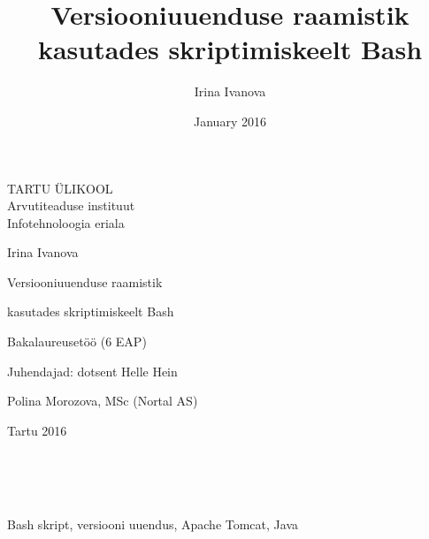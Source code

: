 \documentclass[12pt]{report}
\title{Versiooniuuenduse raamistik kasutades skriptimiskeelt Bash}
\author{Irina Ivanova}
\date{January 2016}
\begin{document}
  \begin{titlepage}
    \begin{center}
      TARTU ÜLIKOOL\\
      Arvutiteaduse instituut\\
      Infotehnoloogia eriala
    \end{center}
      
    \vspace{5cm}
    
    \begin{center}  
      {\Large Irina Ivanova}
    \end{center}
    \begin{center}      
      {\huge Versiooniuuenduse raamistik}
    \end{center}
    \begin{center}
      {\huge kasutades skriptimiskeelt Bash}
    \end{center}
    \begin{center}
      {\large Bakalaureusetöö (6 EAP)}
    \end{center}
      
    \vspace{4cm}
    \hspace{4.5cm}
    Juhendajad: dotsent Helle Hein
    
    \hspace{7cm}
    Polina Morozova, MSc (Nortal AS)
      
    \vspace{2.5cm}
    \begin{center}
      Tartu 2016
    \end{center}
  \end{titlepage}

  \newpage
  
  \\
  
  \\
  \vspace{2cm}
  
  \\
  Bash skript, versiooni uuendus, Apache Tomcat, Java
  \vspace{2cm}

  \\

  \\
  \vspace{2cm}
\end{document}
